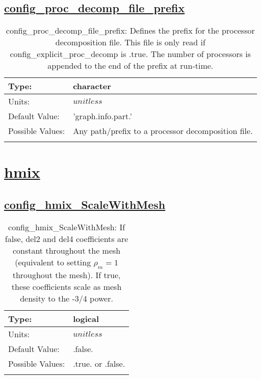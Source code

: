 \subsection[config\_proc\_decomp\_file\_prefix]{\hyperref[sec:nm_tab_decomposition]{config\_proc\_decomp\_file\_prefix}}
\label{subsec:nm_sec_config_proc_decomp_file_prefix}
\begin{center}
\begin{longtable}{| p{2.0in} | p{4.0in} |}
    \hline
    Type: & character \\
    \hline
    Units: & $unitless$ \\
    \hline
    Default Value: & 'graph.info.part.' \\
    \hline
    Possible Values: & Any path/prefix to a processor decomposition file. \\
    \hline
    \caption{config\_proc\_decomp\_file\_prefix: Defines the prefix for the processor decomposition file. This file is only read if config\_explicit\_proc\_decomp is .true. The number of processors is appended to the end of the prefix at run-time.}
\end{longtable}
\end{center}
\section[hmix]{\hyperref[sec:nm_tab_hmix]{hmix}}
\label{sec:nm_sec_hmix}
\subsection[config\_hmix\_ScaleWithMesh]{\hyperref[sec:nm_tab_hmix]{config\_hmix\_ScaleWithMesh}}
\label{subsec:nm_sec_config_hmix_ScaleWithMesh}
\begin{center}
\begin{longtable}{| p{2.0in} | p{4.0in} |}
    \hline
    Type: & logical \\
    \hline
    Units: & $unitless$ \\
    \hline
    Default Value: & .false. \\
    \hline
    Possible Values: & .true. or .false. \\
    \hline
    \caption{config\_hmix\_ScaleWithMesh:  If false, del2 and del4 coefficients are constant throughout the mesh (equivalent to setting  $\rho_m=1$  throughout the mesh).  If true, these coefficients scale as mesh density to the -3/4 power.}
\end{longtable}
\end{center}
